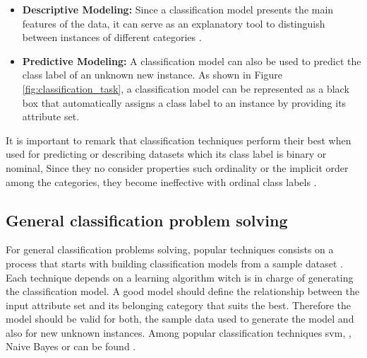 \begin{itemize}
\item \textbf{Descriptive Modeling:} Since a classification model presents the main features of the data, it can serve as an explanatory tool to distinguish between instances of different categories \cite{madigan2002descriptive}.

\item \textbf{Predictive Modeling:} A classification model can also be used to predict the class label of an unknown new instance. As shown in Figure \ref{fig:classification_task}, a classification model can be represented as a black box that automatically assigns a class label to an instance by providing its attribute set.
\end{itemize}

It is important to remark that classification techniques perform their best when used for predicting or describing datasets which its class label is binary or nominal, Since they no consider properties such ordinality or the implicit order among the categories, they become ineffective with ordinal class labels \cite{frank2001simple}.

\subsection{General classification problem solving}
\label{general_classificartion_problem_solving}

For general classification problems solving, popular techniques consists on a process that starts with building classification models from a sample dataset \cite{witten2005data}. Each technique depends on a learning algorithm witch is in charge of generating the classification model. A good model should define the relationship between the input attribute set and its belonging category that suits the best. Therefore the model should be valid for both, the sample data used to generate the model and also for new unknown instances. Among popular classification techniques \acrfull{svm}, , Naive Bayes or  can be found \cite{garje2016sentiment}.

